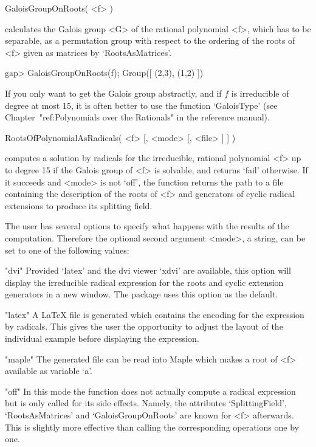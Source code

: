 \> GaloisGroupOnRoots( <f> )

calculates the Galois group <G> of the rational polynomial <f>, which
has to be separable, as a permutation group with respect to the
ordering of the roots of <f> given as matrices by `RootsAsMatrices'.

\beginexample
gap> GaloisGroupOnRoots(f);
Group([ (2,3), (1,2) ])
\endexample

If you only want to get the Galois group abstractly, and if $f$ is
irreducible of degree at most 15, it is often better to use the
function `GaloisType' (see Chapter~"ref:Polynomials over the
Rationals" in the {\GAP} reference manual).



\> RootsOfPolynomialAsRadicals( <f> [, <mode> [, <file> ] ] )

computes a solution by radicals for the irreducible, rational polynomial <f>
up to degree 15 if the Galois group of <f> is
solvable, and returns `fail' otherwise. If it succeeds and <mode> is
not `off', the function returns the path to a file containing the
description of the roots of <f> and generators of cyclic radical
extensions to produce its splitting field.

The user has several options to specify what happens with the results
of the computation. Therefore the optional second argument <mode>, a
string, can be set to one of the following values:

\beginexample
"dvi"
\endexample
Provided `latex' and the dvi viewer `xdvi' are available, this option
will display the irreducible radical expression for the roots and
cyclic extension generators in a new window. The package uses this
option as the default.

\beginexample
"latex"
\endexample
A LaTeX file is generated which contains the encoding for the
expression by radicals. This gives the user the opportunity to adjust
the layout of the individual example before displaying the expression.

\beginexample
"maple"
\endexample
The generated file can be read into Maple \cite{Maple10} which makes a root
of <f> available as variable `a'.

\beginexample
"off"
\endexample
In this mode the function does not actually compute a radical
expression but is only called for its side effects. Namely, the
attributes `SplittingField', `RootsAsMatrices' and
`GaloisGroupOnRoots' are known for <f> afterwards. This is slightly
more effective than calling the corresponding operations one by one.

